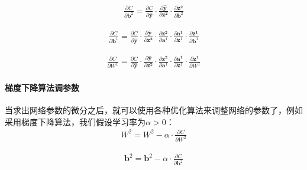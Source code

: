 \documentclass[UTF8]{article}
\begin{document}
\begin{equation}
\begin{aligned}
\frac{\partial{C}}{\partial{\boldsymbol{b}^2}}=\frac{\partial{C}}{\partial{\hat{\boldsymbol{y}}}} \cdot \frac{\partial{\hat{\boldsymbol{y}}}}{\partial{\boldsymbol{z^2}}} \cdot \frac{\partial{\boldsymbol{z^2}}}{\partial{\boldsymbol{b}^2}}
\end{aligned}
\label{mlp-cg-backward-17}
\end{equation}

\begin{equation}
\begin{aligned}
\frac{\partial{C}}{\partial{\boldsymbol{b}^1}}=\frac{\partial{C}}{\partial{\hat{\boldsymbol{y}}}} \cdot \frac{\partial{\hat{\boldsymbol{y}}}}{\partial{\boldsymbol{z^2}}} \cdot \frac{\partial{\boldsymbol{z^2}}}{\partial{\boldsymbol{a}^1}} \cdot \frac{\partial{\boldsymbol{a^1}}}{\partial{\boldsymbol{z}^1}} \cdot \frac{\partial{\boldsymbol{z^1}}}{\partial{\boldsymbol{b}^1}}
\end{aligned}
\label{mlp-cg-backward-18}
\end{equation}

\begin{equation}
\begin{aligned}
\frac{\partial{C}}{\partial{W^1}}=\frac{\partial{C}}{\partial{\hat{\boldsymbol{y}}}} \cdot \frac{\partial{\hat{\boldsymbol{y}}}}{\partial{\boldsymbol{z^2}}} \cdot \frac{\partial{\boldsymbol{z^2}}}{\partial{\boldsymbol{a}^1}} \cdot \frac{\partial{\boldsymbol{a^1}}}{\partial{\boldsymbol{z}^1}} \cdot \frac{\partial{\boldsymbol{z^1}}}{\partial{W^1}}
\end{aligned}
\label{mlp-cg-backward-19}
\end{equation}

\paragraph{梯度下降算法调参数}
当求出网络参数的微分之后，就可以使用各种优化算法来调整网络的参数了，例如采用梯度下降算法，我们假设学习率为$\alpha > 0$：
\begin{equation}
\begin{aligned}
W^2=W^2 - \alpha \cdot \frac{\partial{C}}{\partial{W^2}}
\end{aligned}
\label{mlp-cg-backward-20}
\end{equation}

\begin{equation}
\begin{aligned}
\boldsymbol{b}^2=\boldsymbol{b}^2 - \alpha \cdot \frac{\partial{C}}{\partial{\boldsymbol{b}^2}}
\end{aligned}
\label{mlp-cg-backward-21}
\end{equation}
\end{document}

